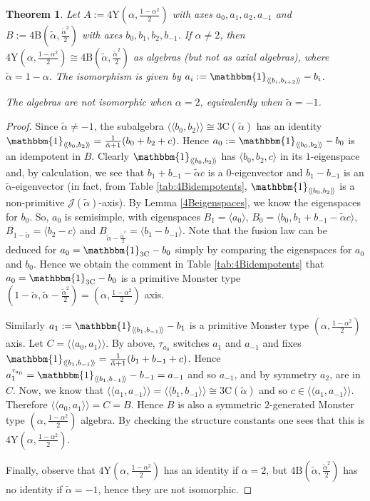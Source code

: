 \documentclass[11pt, a4paper]{article}
\theoremstyle{plain}
\newtheorem{theorem}{Theorem}[section]
\theoremstyle{definition}
\newcommand\al{\alpha}
\newcommand\cJ{\mathcal{J}}
\newcommand\la{\langle}
\newcommand\ra{\rangle}
\newcommand\lla{\langle\!\langle}
\newcommand\rra{\rangle\!\rangle}
\newcommand{\B}{\mathrm{B}}
\newcommand{\C}{\mathrm{C}}
\newcommand{\Y}{\mathrm{Y}}
\newcommand{\0}{\overline{0}}
\newcommand{\2}{\overline{2}}
\newcommand{\1}{\mathbbm{1}}
\begin{document}
\begin{theorem}\label{4B4Yiso}
Let  $A:= 4\Y(\al, \frac{1-\al^2}{2})$ with axes $a_0, a_1, a_2, a_{-1}$ and $B := 4\B(\tilde{\al}, \frac{\tilde{\al}^2}{2})$ with axes $b_0, b_1, b_2, b_{-1}$.  If $\al \neq 2$, then $4\Y(\al, \frac{1-\al^2}{2}) \cong 4\B(\tilde{\al}, \frac{\tilde{\al}^2}{2})$ as algebras \textup{(}but not as axial algebras\textup{)}, where $\tilde{\al} = 1 - \al$.  The isomorphism is given by $a_i := \1_{\lla b_i, b_{i+2} \rra} - b_i$.

The algebras are not isomorphic when $\al = 2$, equivalently when $\tilde{\al} = -1$.
\end{theorem}
\begin{proof}
Since $\tilde{\al} \neq -1$, the subalgebra $\lla b_0, b_2 \rra \cong 3\C(\tilde{\al})$ has an identity $\1_{\lla b_0, b_2 \rra} = \frac{1}{\tilde{\al}+1}(b_0+b_2 + c)$.  Hence $a_0 := \1_{\lla b_0, b_{2} \rra} - b_0$ is an idempotent in $B$.  Clearly $\1_{\lla b_0, b_{2} \rra}$ has $\la b_0,b_2, c \ra$ in its $1$-eigenspace and, by calculation, we see that $b_1+b_{-1} -\tilde{\al} c$ is a $0$-eigenvector and $b_1-b_{-1}$ is an $\tilde{\al}$-eigenvector (in fact, from Table \ref{tab:4Bidempotents}, $\1_{\lla b_0, b_{2} \rra}$ is a non-primitive $\cJ(\tilde{\al})$-axis).  By Lemma \ref{4Beigenspaces}, we know the eigenspaces for $b_0$.  So, $a_0$ is semisimple, with eigenspaces $B_1 = \la a_0 \ra$, $B_0 = \la b_0, b_1+b_{-1} -\tilde{\al} c\ra$, $B_{1-\tilde{\al}} = \la b_2 - c \ra$ and $B_{\tilde{\al} - \frac{\tilde{\al}^2}{2}} = \la b_1 - b_{-1} \ra$.  Note that the fusion law can be deduced for $a_0 = \1_{3\C} - b_0$ simply by comparing the eigenspaces for $a_0$ and $b_0$.  Hence we obtain the comment in Table \ref{tab:4Bidempotents} that $a_0 = \1_{3\C} - b_0$ is a primitive Monster type $(1-\tilde{\al}, \tilde{\al} - \frac{\tilde{\al}^2}{2}) = (\al, \frac{1-\al^2}{2})$ axis.

Similarly $a_1 := \1_{\lla b_1, b_{-1} \rra} - b_1$ is a primitive Monster type $(\al, \frac{1-\al^2}{2})$ axis.  Let $C = \lla a_0, a_1 \rra$.  By above, $\tau_{a_0}$ switches $a_1$ and $a_{-1}$ and fixes $\1_{\lla b_1, b_{-1} \rra} = \frac{1}{\tilde{\al}+1}(b_1+b_{-1} + c)$. Hence $a_1^{\tau_{a_0}} = \1_{\lla b_1, b_{-1} \rra} - b_{-1} = a_{-1}$ and so $a_{-1}$, and by symmetry $a_2$, are in $C$.  Now, we know that $\lla a_1, a_{-1} \rra = \lla b_1, b_{-1} \rra \cong 3\C(\tilde{\al})$ and so $c \in \lla a_1, a_{-1} \rra$.  Therefore $\lla a_0, a_1 \rra = C = B$.  Hence $B$ is also a symmetric $2$-generated Monster type $(\al, \frac{1-\al^2}{2})$ algebra.  By checking the structure constants one sees that this is $4\Y(\al, \frac{1-\al^2}{2})$.

Finally, observe that $4\Y(\al, \frac{1-\al^2}{2})$ has an identity if $\al = 2$, but $4\B(\tilde{\al}, \frac{\tilde{\al}^2}{2})$ has no identity if $\tilde{\al} = -1$, hence they are not isomorphic.
\end{proof}
\end{document}
